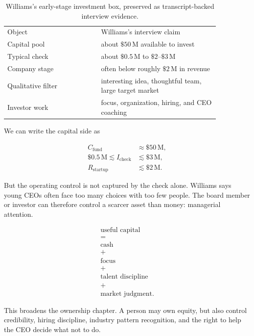 \documentclass[11pt,oneside]{book}
\begin{document}
\begin{table}
\centering
\begin{tabular}{p{0.38\linewidth}p{0.48\linewidth}}
Object & Williams's interview claim \\
Capital pool & about \(\$50\,\mathrm{M}\) available to invest \\
Typical check & about \(\$0.5\,\mathrm{M}\) to \(\$2\text{--}\$3\,\mathrm{M}\) \\
Company stage & often below roughly \(\$2\,\mathrm{M}\) in revenue \\
Qualitative filter & interesting idea, thoughtful team, large target market \\
Investor work & focus, organization, hiring, and CEO coaching \\
\end{tabular}
\caption{Williams's early-stage investment box, preserved as transcript-backed interview evidence.}
\end{table}

We can write the capital side as

\begin{align}
C_{\mathrm{fund}} &\approx \$50\,\mathrm{M},\\
\$0.5\,\mathrm{M} \lesssim I_{\mathrm{check}} &\lesssim \$3\,\mathrm{M},\\
R_{\mathrm{startup}} &\lesssim \$2\,\mathrm{M}.
\end{align}

But the operating control is not captured by the check alone. Williams says young CEOs often face too many choices with too few people. The board member or investor can therefore control a scarcer asset than money: managerial attention.

\begin{equation}
\begin{gathered}
\text{useful capital}\\
=\\
\text{cash}\\
+\\
\text{focus}\\
+\\
\text{talent discipline}\\
+\\
\text{market judgment}.
\end{gathered}
\end{equation}

This broadens the ownership chapter. A person may own equity, but also control credibility, hiring discipline, industry pattern recognition, and the right to help the CEO decide what not to do.
\end{document}
